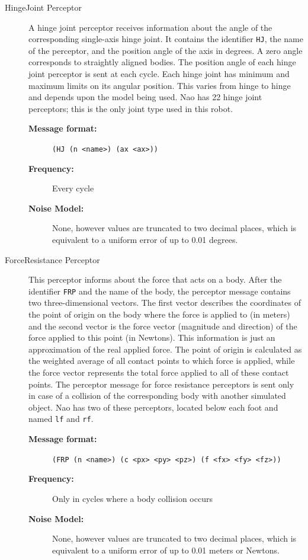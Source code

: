 \begin{description}
  \item [HingeJoint Perceptor]
  A hinge joint perceptor receives information about the angle of the corresponding single-axis hinge joint. It contains the identifier \texttt{HJ}, the name of the perceptor, and the position angle of the axis in degrees. A zero angle corresponds to straightly aligned bodies. The position angle of each hinge joint perceptor is sent at each cycle.
Each hinge joint has minimum and maximum limits on its angular position. This varies from hinge to hinge and depends upon the model being used. Nao has 22 hinge joint perceptors; this is the only joint type used in this robot.

 \begin{description}
  \item[{\bf Message format:}]
  \texttt{(HJ (n <name>) (ax <ax>))}
  \item[{\bf Frequency:}]
  Every cycle
   \item[{\bf Noise Model:}] None, however values are truncated to two decimal places, which is equivalent to a uniform error of up to 0.01 degrees.
  \end{description}
  
  
  \item [ForceResistance Perceptor]
  This perceptor informs about the force that acts on a body.  After the identifier \texttt{FRP} and the name of the body, the perceptor message contains two three-dimensional vectors. The first vector describes the coordinates of the point of origin on the body where the force is applied to (in meters) and the second vector is the force vector (magnitude and  direction) of the force applied to this point (in Newtons). This information is just an approximation of the real applied force. The point of origin is calculated as the weighted average of all contact points to which force is applied, while the force vector represents the total force applied to all of these contact points. The perceptor message for force resistance perceptors is sent only in case of a collision of the corresponding body with another simulated object. Nao has two of these perceptors, located below each foot and named \texttt{lf} and \texttt{rf}.
 \begin{description}
  \item[{\bf Message format:}]
  \texttt{(FRP (n <name>) (c <px> <py> <pz>) (f <fx> <fy> <fz>))}
  \item[{\bf Frequency:}]Only in cycles where a body collision occurs
  \item[{\bf Noise Model:}]
  None, however values are truncated to two decimal places, which is equivalent to a uniform error of up to 0.01 meters or Newtons.
  \end{description}



\end{description}
